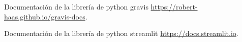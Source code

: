 \documentclass[a4paper,10pt,twocolumn]{article}
\begin{document}



\begin{thebibliography}{99}

	Documentación de la librería de python gravis \href{https://robert-haas.github.io/gravis-docs/}{https://robert-haas.github.io/gravis-docs}.

	Documentación de la librería de python streamlit \href{https://docs.streamlit.io}{https://docs.streamlit.io}.



\end{thebibliography}


\label{end}
\end{document}
